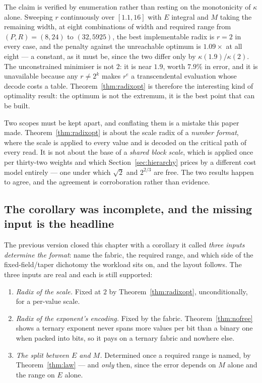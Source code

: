 \documentclass[11pt]{article}
\theoremstyle{definition}
\begin{document}
The claim is verified by enumeration rather than resting on the monotonicity of
$\kappa$ alone. Sweeping $r$ continuously over $[1.1, 16]$ with $E$ integral and
$M$ taking the remaining width, at eight combinations of width and required range
from $(P,R) = (8, 24)$ to $(32, 5925)$, the best implementable radix is $r = 2$ in
every case, and the penalty against the unreachable optimum is $1.09\times$ at all
eight --- a constant, as it must be, since the two differ only by
$\kappa(1.9)/\kappa(2)$. The unconstrained minimiser is not $2$: it is near
$1.9$, worth $7.9\%$ in error, and it is unavailable because any $r \neq 2^{k}$
makes $r^{e}$ a transcendental evaluation whose decode costs a table.
Theorem~\ref{thm:radixopt} is therefore the interesting kind of optimality
result: the optimum is not the extremum, it is the best point that can be built.

Two scopes must be kept apart, and conflating them is a mistake this paper made.
Theorem~\ref{thm:radixopt} is about the scale radix of a \emph{number format},
where the scale is applied to every value and is decoded on the critical path of
every read. It is not about the base of a \emph{shared block scale}, which is
applied once per thirty-two weights and which Section~\ref{sec:hierarchy} prices
by a different cost model entirely --- one under which $\sqrt2$ and $2^{2/3}$ are
free. The two results happen to agree, and the agreement is corroboration rather
than evidence.

\subsection{The corollary was incomplete, and the missing input is the headline}
\label{sec:threeparams}

The previous version closed this chapter with a corollary it called \emph{three
inputs determine the format}: name the fabric, the required range, and which side
of the fixed-field/taper dichotomy the workload sits on, and the layout follows.
The three inputs are real and each is still supported:

\begin{enumerate}[leftmargin=*,itemsep=2pt]
\item \emph{Radix of the scale.} Fixed at $2$ by Theorem~\ref{thm:radixopt},
unconditionally, for a per-value scale.
\item \emph{Radix of the exponent's encoding.} Fixed by the fabric.
Theorem~\ref{thm:nofree} shows a ternary exponent never spans more values per bit
than a binary one when packed into bits, so it pays on a ternary fabric and
nowhere else.
\item \emph{The split between $E$ and $M$.} Determined once a required range is
named, by Theorem~\ref{thm:law} --- and \emph{only} then, since the error depends
on $M$ alone and the range on $E$ alone.
\end{enumerate}
\end{document}
